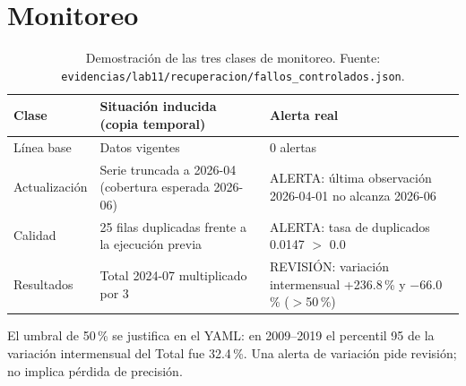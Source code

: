 \documentclass[11pt,a4paper]{article}
\newcommand{\cod}[1]{\texttt{\small #1}}
\begin{document}
\section{Monitoreo}
\begin{table}[H]\centering\small
\caption{Demostración de las tres clases de monitoreo. Fuente: \cod{evidencias/lab11/recuperacion/}\allowbreak\cod{fallos\_controlados.json}.}
\begin{tabularx}{\textwidth}{@{}lLL@{}}\toprule
Clase & Situación inducida (copia temporal) & Alerta real\\\midrule
Línea base & Datos vigentes & 0 alertas\\
Actualización & Serie truncada a 2026-04 (cobertura esperada 2026-06) & ALERTA: última observación 2026-04-01 no alcanza 2026-06\\
Calidad & 25 filas duplicadas frente a la ejecución previa & ALERTA: tasa de duplicados 0.0147 $>$ 0.0\\
Resultados & Total 2024-07 multiplicado por 3 & REVISIÓN: variación intermensual +236.8\,\% y $-$66.0\,\% ($>$50\,\%)\\
\bottomrule\end{tabularx}
\end{table}
\noindent El umbral de 50\,\% se justifica en el YAML: en 2009--2019 el percentil 95 de la variación intermensual del Total fue 32.4\,\%. Una alerta de variación pide revisión; no implica pérdida de precisión.

\end{document}
